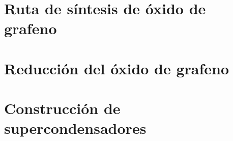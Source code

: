\chapter{Ruta de síntesis de óxido de grafeno}

\chapter{Reducción del óxido de grafeno}

\chapter{Construcción de supercondensadores}
